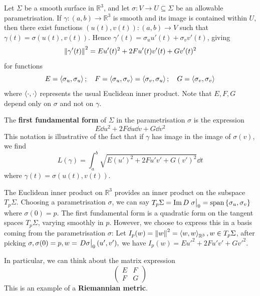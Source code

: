 \documentclass[a4paper]{article}
\begin{document}
Let \( \Sigma \) be a smooth surface in \( \mathbb R^3 \), and let \( \sigma \colon V \to U \subseteq \Sigma \) be an allowable parametrisation.
If \( \gamma \colon (a,b) \to \mathbb R^3 \) is smooth and its image is contained within \( U \), then there exist functions \( (u(t), v(t)) \colon (a,b) \to V \) such that \( \gamma(t) = \sigma(u(t), v(t)) \).
Hence \( \gamma'(t) = \sigma_u u'(t) + \sigma_v v'(t) \), giving
\[
	\norm{\gamma'(t)}^2 = E u'(t)^2 + 2F u'(t) v'(t) + G v'(t)^2
\]
for functions
\[
	E = \left\langle{\sigma_u, \sigma_u}\right\rangle;\quad F = \left\langle{\sigma_u, \sigma_v}\right\rangle = \left\langle{\sigma_v, \sigma_u}\right\rangle;\quad G = \left\langle{\sigma_v, \sigma_v}\right\rangle
\]
where \( \left\langle{\cdot,\cdot}\right\rangle \) represents the usual Euclidean inner product.
Note that \( E, F, G \) depend only on \( \sigma \) and not on \( \gamma \).
\begin{definition}
	The \textbf{first fundamental form} of \( \Sigma \) in the parametrisation \( \sigma \) is the expression
	\[
		E \dd{u}^2 + 2F \dd{u} \dd{v} + G \dd{v}^2
	\]
	This notation is illustrative of the fact that if \( \gamma \) has image in the image of \( \sigma(v) \), we find
	\[
		L(\gamma) = \int_a^b \sqrt{E (u')^2 + 2F u'v' + G (v')^2} \dd{t}
	\]
	where \( \gamma(t) = \sigma(u(t),v(t)) \).
\end{definition}
\begin{remark}
	The Euclidean inner product on \( \mathbb R^3 \) provides an inner product on the subspace \( T_p \Sigma \).
	Choosing a parametrisation \( \sigma \), we can say \( T_p \Sigma = \Im D \eval{\sigma}_0 = \spn{\qty{\sigma_u, \sigma_v}} \) where \( \sigma(0) = p \).
	The first fundamental form is a quadratic form on the tangent spaces \( T_p \Sigma \), varying smoothly in \( p \).
	However, we choose to express this in a basis coming from the parametrisation \( \sigma \): Let $ I_p(w) = \norm{w}^2 = \left\langle{w,w}\right\rangle_{\mathbb{R}^3}, w\in T_p\Sigma $, after picking $ \sigma, \sigma(0) = p, w = \eval{D\sigma}_0(u',v' ), $ we have $ I_p(w) = E u'^2 + 2F u'v' + G v'^2 $. 

	In particular, we can think about the matrix expression
	\[
		\begin{pmatrix}
			E & F \\
			F & G
		\end{pmatrix}
	\]
	This is an example of a \textbf{Riemannian metric}. 
\end{remark}
\end{document}
